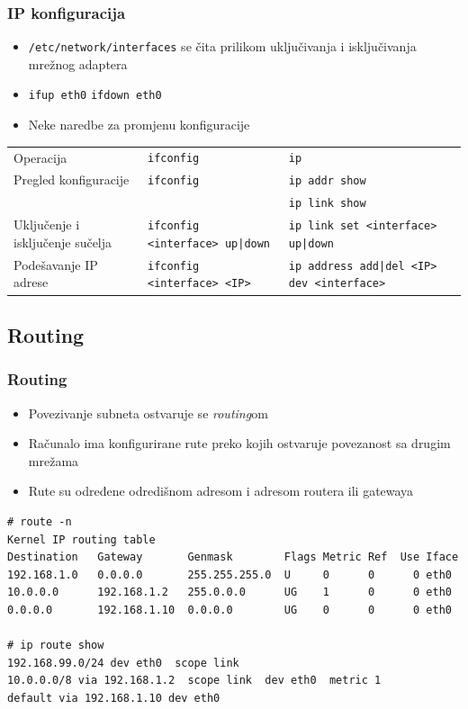 \documentclass[t,table,usenames,dvipsnames]{beamer}
\begin{document}
\begin{frame}
	\frametitle{IP konfiguracija}
	\begin{itemize}
		\item \texttt{/etc/network/interfaces} se čita prilikom uključivanja i isključivanja mrežnog adaptera
		\item[] \texttt{ifup eth0} \hspace{2em} \texttt{ifdown eth0}
	\end{itemize}
	\begin{itemize}
		\item Neke naredbe za promjenu konfiguracije
	\end{itemize}
	\begin{table}[h]
		\begin{tabular}{p{4cm} p{3cm} p{3cm}}
			\rowcolor{BlueViolet!20}Operacija & \texttt{ifconfig} & \texttt{ip} \\
			Pregled konfiguracije & \texttt{ifconfig} & \texttt{ip addr show} \\ & & \texttt{ip link show} \\
			Uključenje i isključenje sučelja & \texttt{ifconfig <interface> up|down} & \texttt{ip link set <interface> up|down} \\
			Podešavanje IP adrese & \texttt{ifconfig <interface> <IP>} & \texttt{ip address add|del <IP> dev <interface>}
		\end{tabular}
	\end{table}
\end{frame}

\subsection{Routing}
\begin{frame}[fragile]
	\frametitle{Routing}
	\begin{itemize}
		\item Povezivanje subneta ostvaruje se \emph{routing}om
		\item Računalo ima konfigurirane rute preko kojih ostvaruje povezanost sa drugim mrežama
	\end{itemize}
	\begin{itemize}
		\item Rute su određene odredišnom adresom i adresom routera ili gatewaya
	\end{itemize}
	{\footnotesize \begin{verbatim}
# route -n
Kernel IP routing table
Destination   Gateway       Genmask        Flags Metric Ref  Use Iface
192.168.1.0   0.0.0.0       255.255.255.0  U     0      0      0 eth0
10.0.0.0      192.168.1.2   255.0.0.0      UG    1      0      0 eth0
0.0.0.0       192.168.1.10  0.0.0.0        UG    0      0      0 eth0

# ip route show
192.168.99.0/24 dev eth0  scope link
10.0.0.0/8 via 192.168.1.2  scope link  dev eth0  metric 1
default via 192.168.1.10 dev eth0
	\end{verbatim} }
\end{frame}
\end{document}
